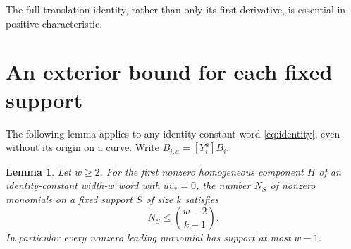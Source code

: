 \documentclass[11pt]{article}
\newtheorem{lemma}[theorem]{Lemma}
\begin{document}
The full translation identity, rather than only its first derivative,
is essential in positive characteristic.

\section{An exterior bound for each fixed support}

The following lemma applies to any identity-constant word
\eqref{eq:identity}, even without its origin on a curve. Write
$B_{i,a}=[Y_i^a]B_i$.

\begin{lemma}\label{lem:exterior}
Let $w\ge2$. For the first nonzero homogeneous component $H$ of an identity-constant
width-$w$ word with $uv_*=0$, the number $N_S$ of nonzero monomials on
a fixed support $S$ of size $k$ satisfies
\[
 N_S\le\binom{w-2}{k-1}.
\]
In particular every nonzero leading monomial has support at most $w-1$.
\end{lemma}
\end{document}
